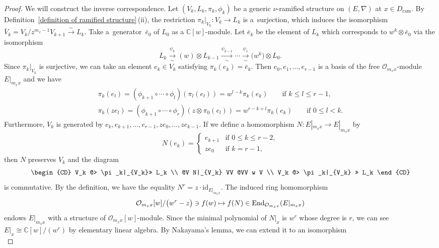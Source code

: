 \documentclass[pdftex]{sigma}
\numberwithin{equation}{section}
\newcommand\End{\mathop{\rm End}\nolimits}
\begin{document}
\begin{proof}
We will construct the inverse correspondence.
Let $(V_k,L_k,\pi_k,\phi_k)$
be a generic $\nu$-ramified structure on $(E,\nabla)$ at $x\in D_{\mathrm{ram}}$.
By Definition~\ref{definition of ramified structure}\,(ii), the restriction
$\pi_k|_{V_k}\colon V_k\longrightarrow L_k$
is a~surjection, which induces the isomorphism
$\overline{V}_k=V_k/z^{m_x-1}V_{k+1}
\xrightarrow{\sim} L_k$.
Take a~generator~$\bar{e}_0$ of $L_0$ as a $\mathbb{C}[w]$-module.
Let $\bar{e}_k$ be the element of $L_k$
which corresponds to $w^k\otimes \bar{e}_0$
via the isomorphism
\[
 L_k\xrightarrow[\sim]{\psi_k}(w)\otimes L_{k-1}
 \xrightarrow[\sim]{\psi_{k-1}}\cdots\xrightarrow[\sim]{\psi_1}\big(w^k\big)\otimes L_0.
\]
Since $\pi_k|_{V_k}$ is surjective, we can take an element $e_k\in V_k$ satisfying
$\pi_k(e_k)=\bar{e}_k$.
Then $e_0,e_1,\dots,e_{r-1}$ is a basis of the free ${\mathcal O}_{m_xx}$-module
$E|_{m_xx}$ and
we have
\begin{gather*}
 \pi_k(e_l)
 =
 (\phi_{k+1}\circ\cdots\circ\phi_l)(\pi_l(e_l))
 =w^{l-k}\pi_k(e_k) \qquad \text{if $k\leq l\leq r-1$},
 \\
 \pi_k(ze_l)
 =
 (\phi_{k+1} \circ\cdots\circ\phi_r)(z\otimes\pi_0(e_l))
 =w^{r-k+l}\pi_k(e_k)
 \qquad \text{if $0\leq l<k$}.
\end{gather*}
Furthermore, $V_k$ is generated by $e_k,e_{k+1},\dots,e_{r-1},ze_0,\dots,ze_{k-1}$.
If we define a homomorphism
$
 N\colon E|_{m_xx}\longrightarrow E|_{m_xx}
$
by
\[
 N(e_k)
 =
 \begin{cases}
 e_{k+1} & \text{if $0\leq k\leq r-2$}, \\
 ze_0 & \text{if $k=r-1$},
 \end{cases}
\]
then $N$ preserves $V_k$ and the diagram
\[
 \begin{CD}
 V_k @> \pi_k|_{V_k}>> L_k \\
 @V N|_{V_k} VV @VV w V \\
 V_k @> \pi_k|_{V_k} >> L_k
 \end{CD}
\]
is commutative.
By the definition, we have the equality $N^r=z\cdot\mathrm{id}_{E|_{m_xx}}$.
The induced ring homomorphism
\[
 {\mathcal O}_{m_xx}[w]/\big(w^r-z\big)
 \ni f(w) \mapsto f(N) \in \End_{{\mathcal O}_{m_xx}}(E|_{m_xx})
\]
endows $E|_{m_xx}$ with a structure of ${\mathcal O}_{m_xx}[w]$-module.
Since the minimal polynomial of
$N|_x$ is $w^r$ whose degree is $r$,
we can see $E|_x\cong\mathbb{C}[w]/(w^r)$ by elementary linear algebra.
By Nakayama's lemma, we can extend it to an isomorphism
\begin{equation} \label{equation: isomorphism by PID theory}

\end{equation}
\end{proof}
\end{document}
